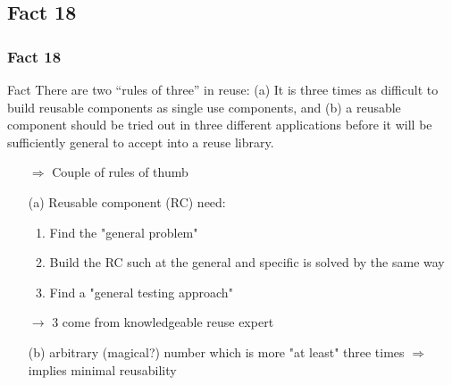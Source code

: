 \documentclass{beamer}
\begin{document}
\subsection{Fact 18}
\begin{frame}
    \frametitle{Fact 18}
    \begin{block}{Fact}
    There are two \enquote{rules of three} in reuse: (a) It is three times as
    difficult to build reusable components as single use components, and (b) a
    reusable component should be tried out in three different applications
    before it will be sufficiently general to accept into a reuse library.
    \end{block}

    \begin{itemize}
        \item[$\Rightarrow$] Couple of rules of thumb

        \item[(a)] Reusable component (RC) need:
            \begin{enumerate}
                \item Find the "general problem"
                \item Build the RC such at the general and specific is
                    solved by the same way
                \item Find a "general testing approach"
            \end{enumerate}

            $\rightarrow$  3 come from knowledgeable reuse expert

        \item[(b)] arbitrary (magical?) number which is more "at
            least" three times $\Rightarrow$ implies minimal reusability
    \end{itemize}
\end{frame}
\end{document}
